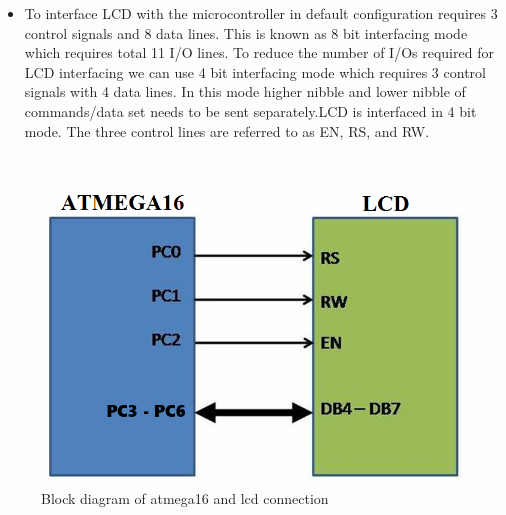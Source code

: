 \documentclass[a4paper,12pt,oneside]{book}
\begin{document}
	\begin{itemize}
	\item {
	To interface LCD with the microcontroller in default configuration requires 3 control signals and
	8 data lines. This is known as 8 bit interfacing mode which requires total 11 I/O lines. To reduce
	the number of I/Os required for LCD interfacing we can use 4 bit interfacing mode which
	requires 3 control signals with 4 data lines. In this mode higher nibble and lower nibble of
	commands/data set needs to be sent separately.LCD is interfaced in 4 bit
	mode. The three control lines are referred to as EN, RS, and RW.
	}
	\end{itemize}

	\hfill\\
	\begin{figure}[h!]
		\caption{Block diagram of atmega16 and lcd connection}
		\includegraphics[width=\textwidth]{./HardwareManual/lcd.png}
	\end{figure}	
	\hfill\\
	
\end{document}
